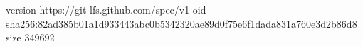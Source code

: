 version https://git-lfs.github.com/spec/v1
oid sha256:82ad385b01a1d933443abc0b5342320ae89d0f75e6f1dada831a760e3d2b86d8
size 349692

